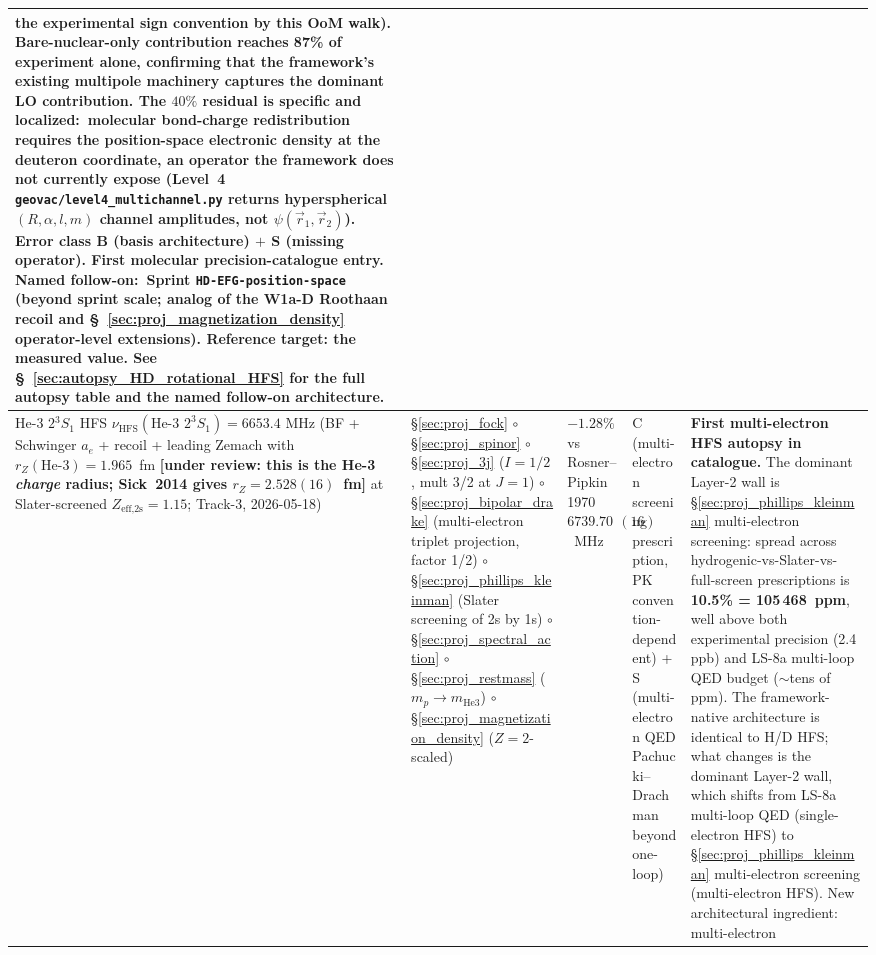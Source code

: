 \documentclass[11pt]{article}
\begin{document}
{\begin{longtable}{p{3.8cm} p{2.5cm} p{1.5cm} p{1.4cm} p{4.5cm}}
the experimental sign convention by this OoM walk).  Bare-nuclear-only
contribution reaches 87\% of experiment alone, confirming that
the framework's existing multipole machinery captures the dominant
LO contribution.  The $40\%$ residual is specific and localized:\
molecular bond-charge redistribution requires the position-space
electronic density at the deuteron coordinate, an operator the
framework does not currently expose (Level~4
\texttt{geovac/level4\_multichannel.py} returns hyperspherical
$(R, \alpha, l, m)$ channel amplitudes, not
$\psi(\vec{r}_1, \vec{r}_2)$).  Error class B (basis architecture)
$+$ S (missing operator).  First molecular precision-catalogue entry.
\textbf{Named follow-on}:\ Sprint \texttt{HD-EFG-position-space}
(beyond sprint scale; analog of the W1a-D Roothaan recoil and
\S~\ref{sec:proj_magnetization_density} operator-level extensions).
Reference target: the measured value.
See \S~\ref{sec:autopsy_HD_rotational_HFS} for the full autopsy
table and the named follow-on architecture. \\
\midrule
He-3 $2{}^3S_1$ HFS $\nu_\text{HFS}(\text{He-3 } 2^3S_1) = 6653.4$ MHz
(BF + Schwinger $a_e$ + recoil + leading Zemach with $r_Z(\text{He-3})
= 1.965$~fm \textbf{[under review: this is the He-3 \emph{charge}
radius; Sick~2014 gives $r_Z = 2.528(16)$~fm]} at Slater-screened
$Z_\text{eff,2s} = 1.15$; Track-3,
2026-05-18) &
\S\ref{sec:proj_fock} $\circ$ \S\ref{sec:proj_spinor} $\circ$
\S\ref{sec:proj_3j} ($I=1/2$, mult 3/2 at $J=1$) $\circ$
\S\ref{sec:proj_bipolar_drake} (multi-electron triplet projection,
factor 1/2) $\circ$ \S\ref{sec:proj_phillips_kleinman} (Slater
screening of 2s by 1s) $\circ$ \S\ref{sec:proj_spectral_action}
$\circ$ \S\ref{sec:proj_restmass} ($m_p \to m_\text{He3}$) $\circ$
\S\ref{sec:proj_magnetization_density} ($Z=2$-scaled) &
$-1.28\%$ vs Rosner--Pipkin 1970
$6739.701177(16)$~MHz & C (multi-electron screening prescription,
PK convention-dependent) + S (multi-electron QED Pachucki--Drachman
beyond one-loop) &
\textbf{First multi-electron HFS autopsy in catalogue.} The dominant
Layer-2 wall is \S\ref{sec:proj_phillips_kleinman} multi-electron
screening: spread across hydrogenic-vs-Slater-vs-full-screen
prescriptions is \textbf{10.5\% = 105\,468~ppm}, well above both
experimental precision (2.4 ppb) and LS-8a multi-loop QED budget
($\sim$tens of ppm). The framework-native architecture is identical
to H/D HFS; what changes is the dominant Layer-2 wall, which shifts
from LS-8a multi-loop QED (single-electron HFS) to
\S\ref{sec:proj_phillips_kleinman} multi-electron screening
(multi-electron HFS). New architectural ingredient: multi-electron

\end{longtable}}
\end{document}
